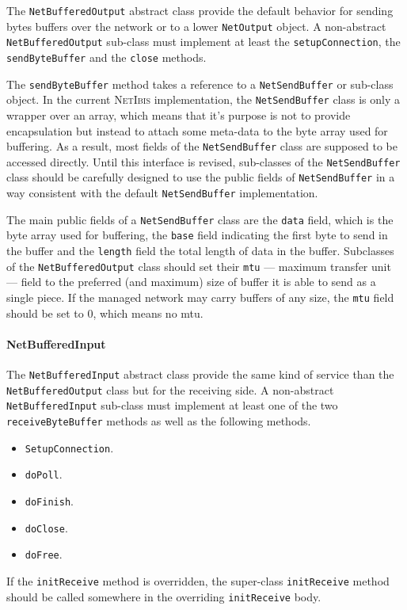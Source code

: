 \documentclass[11pt]{book}
\def\NetIbis{\textsc{NetIbis}\xspace}
\begin{document}
The \texttt{NetBufferedOutput} abstract class provide the default
behavior for sending bytes buffers over the network or to a lower
\texttt{NetOutput} object. A non-abstract \texttt{NetBufferedOutput}
sub-class must implement at least the \texttt{setupConnection}, the
\texttt{sendByteBuffer} and the \texttt{close} methods.

The \texttt{sendByteBuffer} method takes a reference to a
\texttt{NetSendBuffer} or sub-class object. In the current \NetIbis
implementation, the \texttt{NetSendBuffer} class is only a wrapper
over an array, which means that it's purpose is not to provide
encapsulation but instead to attach some meta-data to the byte array
used for buffering. As a result, most fields of the
\texttt{NetSendBuffer} class are supposed to be accessed directly.
Until this interface is revised, sub-classes of the
\texttt{NetSendBuffer} class should be carefully designed to use the
public fields of \texttt{NetSendBuffer} in a way consistent with the
default \texttt{NetSendBuffer} implementation.

The main public fields of a \texttt{NetSendBuffer} class are the
\texttt{data} field, which is the byte array used for buffering, the
\texttt{base} field indicating the first byte to send in the buffer
and the \texttt{length} field the total length of data in the buffer.
Subclasses of the \texttt{NetBufferedOutput} class should set their
\texttt{mtu} --- maximum transfer unit --- field to the preferred (and
maximum) size of buffer it is able to send as a single piece. If the
managed network may carry buffers of any size, the \texttt{mtu} field
should be set to 0, which means no mtu.


\paragraph{NetBufferedInput}
\label{sec:netbufferedinput}

The \texttt{NetBufferedInput} abstract class provide the same kind of
service than the \texttt{NetBufferedOutput} class but for the
receiving side. A non-abstract \texttt{NetBufferedInput} sub-class
must implement at least one of the two \texttt{receiveByteBuffer}
methods as well as the following methods.
\begin{itemize}
\item \texttt{SetupConnection}.
\item \texttt{doPoll}.
\item \texttt{doFinish}.
\item \texttt{doClose}.
\item \texttt{doFree}.
\end{itemize}
If the \texttt{initReceive} method is overridden, the super-class
\texttt{initReceive} method should be called somewhere in the
overriding \texttt{initReceive} body.
\end{document}
